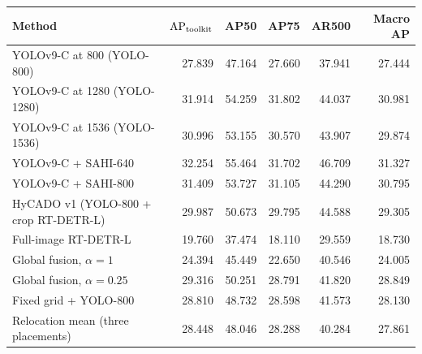 \begin{tabular}{lrrrrr}
\toprule
Method & $\mathrm{AP}_{\mathrm{toolkit}}$ & AP50 & AP75 & AR500 & Macro AP\\
\midrule
YOLOv9-C at 800 (YOLO-800) & 27.839 & 47.164 & 27.660 & 37.941 & 27.444\\
YOLOv9-C at 1280 (YOLO-1280) & 31.914 & 54.259 & 31.802 & 44.037 & 30.981\\
YOLOv9-C at 1536 (YOLO-1536) & 30.996 & 53.155 & 30.570 & 43.907 & 29.874\\
YOLOv9-C + SAHI-640 & 32.254 & 55.464 & 31.702 & 46.709 & 31.327\\
YOLOv9-C + SAHI-800 & 31.409 & 53.727 & 31.105 & 44.290 & 30.795\\
HyCADO v1 (YOLO-800 + crop RT-DETR-L) & 29.987 & 50.673 & 29.795 & 44.588 & 29.305\\
\midrule
Full-image RT-DETR-L & 19.760 & 37.474 & 18.110 & 29.559 & 18.730\\
Global fusion, $\alpha=1$ & 24.394 & 45.449 & 22.650 & 40.546 & 24.005\\
Global fusion, $\alpha=0.25$ & 29.316 & 50.251 & 28.791 & 41.820 & 28.849\\
Fixed grid + YOLO-800 & 28.810 & 48.732 & 28.598 & 41.573 & 28.130\\
Relocation mean (three placements) & 28.448 & 48.046 & 28.288 & 40.284 & 27.861\\
\bottomrule
\end{tabular}
